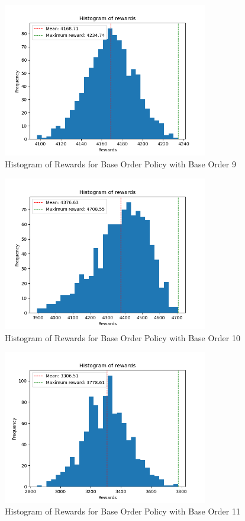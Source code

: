 \begin{figure}[H]
    \centering
    \includegraphics[width=0.8\textwidth]{figure/Histogram of rewards - Base 9.png}
    \caption{Histogram of Rewards for Base Order Policy with Base Order 9}
    \label{fig:hist-base-9}
\end{figure}
\begin{figure}[H]
    \centering
    \includegraphics[width=0.8\textwidth]{figure/Histogram of rewards - Base 10.png}
    \caption{Histogram of Rewards for Base Order Policy with Base Order 10}
    \label{fig:hist-base-10}
\end{figure}
\begin{figure}[H]
    \centering
    \includegraphics[width=0.8\textwidth]{figure/Histogram of rewards - Base 11.png}
    \caption{Histogram of Rewards for Base Order Policy with Base Order 11}
    \label{fig:hist-base-11}
\end{figure}
